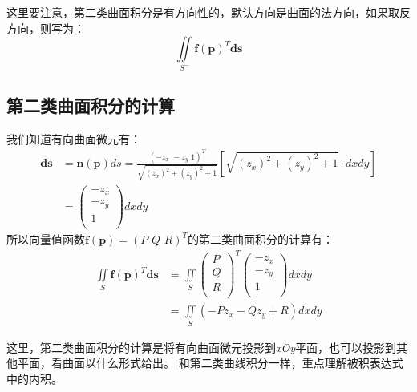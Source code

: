 这里要注意，第二类曲面积分是有方向性的，默认方向是曲面的法方向，如果取反方向，则写为：
\[
\iint\limits_{S^-}{\boldsymbol{f}\left( \boldsymbol{p} \right) ^T\boldsymbol{ds}}
\]

\subsection{第二类曲面积分的计算}

\begin{theorem}[第二类曲面积分的计算公式]
我们知道有向曲面微元有：
\begin{align*}
\boldsymbol{ds}&=\mathbf{n}\left( \boldsymbol{p} \right) ds=\frac{\left( -z_x\,\,-z_y\,\,1 \right) ^T}{\sqrt{\left( z_x \right) ^2+\left( z_y \right) ^2+1}} \left[ \sqrt{\left( z_x \right) ^2+\left( z_y \right) ^2+1}\cdot dxdy \right] \\
&=\left( \begin{array}{c}
	-z_x\\
	-z_y\\
	1\\
\end{array} \right) dxdy
\end{align*}
所以向量值函数$\boldsymbol{f}\left( \boldsymbol{p} \right) =\left( P\,\,Q\,\,R \right) ^T$的第二类曲面积分的计算有：
\begin{align*}
\iint\limits_S{\boldsymbol{f}\left( \boldsymbol{p} \right) ^T\boldsymbol{ds}}&=\iint\limits_S{\left( \begin{array}{c}
	P\\
	Q\\
	R\\
\end{array} \right) ^T\left( \begin{array}{c}
	-z_x\\
	-z_y\\
	1\\
\end{array} \right) dxdy} \\
&=\iint\limits_S{\left( -Pz_x-Qz_y+R \right) dxdy}
\end{align*}
\end{theorem}

这里，第二类曲面积分的计算是将有向曲面微元投影到{\it xOy}平面，也可以投影到其他平面，看曲面以什么形式给出。
和第二类曲线积分一样，重点理解被积表达式中的内积。

